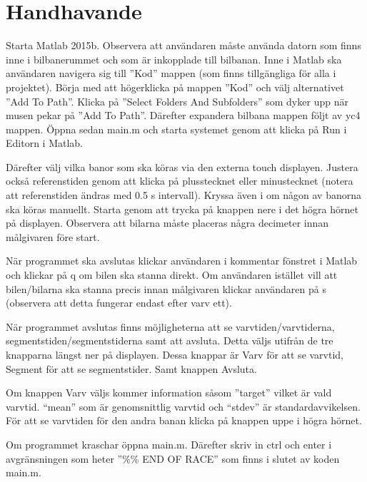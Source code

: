 \section{Handhavande}
\label{app:handhavande}
Starta Matlab 2015b. Observera att användaren måste använda datorn som finns
inne i bilbanerummet och som är inkopplade till bilbanan. Inne i Matlab ska användaren navigera sig till ''Kod'' mappen (som finns tillgängliga för alla i projektet). Börja med att högerklicka på mappen ''Kod'' och välj alternativet ''Add To Path''. Klicka på ''Select Folders And Subfolders'' som dyker upp när musen pekar på ''Add To Path''. Därefter expandera bilbana mappen följt av yc4 mappen. Öppna sedan main.m och starta systemet genom att klicka på Run i Editorn i Matlab.

Därefter välj vilka banor som ska köras via den externa touch displayen. Justera också referenstiden genom att klicka på plusstecknet eller minustecknet (notera att referenstiden ändras med 0.5 s intervall). Kryssa även i om någon av banorna ska köras manuellt. Starta genom att trycka på knappen nere i det högra hörnet på displayen. Observera att bilarna måste placeras några decimeter innan målgivaren före start.

När programmet ska avslutas klickar användaren i kommentar fönstret i Matlab och
klickar på q om bilen ska stanna direkt. Om användaren istället vill att
bilen/bilarna ska stanna precis innan målgivaren klickar användaren på s
(observera att detta fungerar endast efter varv ett).

När programmet avslutas finns möjligheterna att se varvtiden/varvtiderna,
segmentstiden/segmentstiderna samt att avsluta. Detta väljs utifrån de tre
knapparna längst ner på displayen. Dessa knappar är Varv för att se varvtid,
Segment för att se segmentstider. Samt knappen Avsluta.

Om knappen Varv väljs kommer information såsom ''target'' vilket är vald varvtid.
“mean” som är genomsnittlig varvtid och “stdev” är standardavvikelsen. För att
se varvtiden för den andra banan klicka på knappen uppe i högra hörnet.

Om programmet kraschar öppna main.m. Därefter skriv in
ctrl och enter i avgränsningen som heter ''\%\% END OF RACE'' som finns i slutet av
koden main.m.

